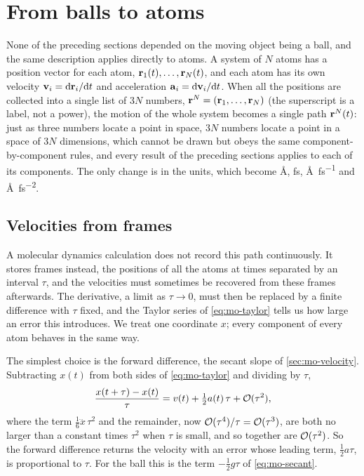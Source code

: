 \section{From balls to atoms}
\label{sec:mo-atoms}

None of the preceding sections depended on the moving object being a
ball, and the same description applies directly to atoms. A system of $N$
atoms has a position vector for each atom, $\bm{\mathrm{r}}_1(t), \dots,
\bm{\mathrm{r}}_N(t)$, and each atom has its own velocity $\bm{\mathrm{v}}_i =
\mathrm{d}\bm{\mathrm{r}}_i/\mathrm{d} t$ and acceleration $\bm{\mathrm{a}}_i = \mathrm{d}\bm{\mathrm{v}}_i/\mathrm{d} t$. When
all the positions are collected into a single list of $3N$ numbers,
$\bm{\mathrm{r}}^N = (\bm{\mathrm{r}}_1, \dots, \bm{\mathrm{r}}_N)$ (the superscript is a label,
not a power), the motion of the whole system becomes a single path
$\bm{\mathrm{r}}^N(t)$: just as three numbers locate a point in space, $3N$
numbers locate a point in a space of $3N$ dimensions, which cannot be
drawn but obeys the same component-by-component rules, and every result of the preceding sections applies to each of its components.
The only change is in the units, which become \si{\angstrom},
\si{\femto\second}, \si{\angstrom\per\femto\second} and
\si{\angstrom\per\femto\second\squared}.

\subsection*{Velocities from frames}

A molecular dynamics calculation does not record this path continuously.
It stores frames instead, the positions of all the atoms at times
separated by an interval $\tau$, and the velocities must sometimes be
recovered from these frames afterwards. The derivative, a limit as $\tau
\to 0$, must then be replaced by a finite difference with $\tau$ fixed, and
the Taylor series of \cref{eq:mo-taylor} tells us how large an error this
introduces. We treat one coordinate $x$; every component of every atom
behaves in the same way.

The simplest choice is the forward difference, the secant slope of
\cref{sec:mo-velocity}. Subtracting $x(t)$ from both sides of
\cref{eq:mo-taylor} and dividing by $\tau$,
\begin{equation*}
   \frac{x(t+\tau) - x(t)}{\tau} = v(t) + \tfrac12 a(t)\,\tau
   + \mathcal{O}(\tau^2),
\end{equation*}
where the term $\tfrac16\dddot{x}\,\tau^2$ and the remainder, now
$\mathcal{O}(\tau^4)/\tau = \mathcal{O}(\tau^3)$, are both no larger than a constant
times $\tau^2$ when $\tau$ is small, and so together are $\mathcal{O}(\tau^2)$.
So the forward difference returns the velocity with an error whose leading
term, $\tfrac12 a\tau$, is proportional to $\tau$. For the ball this is
the term $-\tfrac12 g\tau$ of \cref{eq:mo-secant}.

